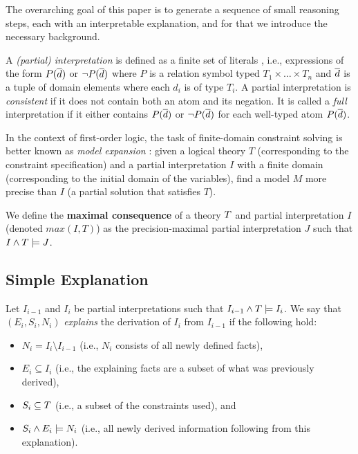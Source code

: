 The overarching goal of this paper is to generate a sequence of small reasoning steps, each with an interpretable explanation, and for that we introduce the necessary background.

A \emph{(partial) interpretation} is defined as a finite set of literals 
, i.e., expressions of the form 
$P(\overline{d})$ or $\lnot P(\overline{d})$ where $P$ is a relation symbol typed $T_1\times\dots \times T_n$ and $\overline{d}$ is a tuple of domain elements where each $d_i$ is of type $T_i$. 
A partial interpretation is \emph{consistent} if it does not contain both an atom and its negation.
It is called a \emph{full} interpretation if it either contains $P(\overline{d})$ or $\lnot P(\overline{d})$ for each well-typed atom $P(\overline{d})$.

In the context of first-order logic, the task of finite-domain constraint solving is better known as \emph{model expansion} \cite{MitchellTHM06}: given a logical theory $T$ (corresponding to the constraint specification) and a partial interpretation $I$ with a finite domain (corresponding to the initial domain of the variables), find a model $M$ more precise than $I$ (a partial solution that satisfies $T$).

We define the \textbf{maximal consequence} of a theory $T$ and partial interpretation $I$ (denoted $max(I,T)$) as the precision-maximal partial interpretation $J$ such that  $I \wedge T \models J$.

\subsection{Simple Explanation}

Let $I_{i-1}$ and $I_i$ be partial interpretations such that $I_{i-1}\land T \models I_i$.
We say that $(E_i,S_i,N_i)$ \emph{explains} the derivation of $I_{i}$ from $I_{i-1}$ if the following hold:
\begin{itemize}
   \item $N_i= I_i \setminus I_{i-1}$ (i.e., $N_i$ consists of all newly defined facts), 
   \item $E_i\subseteq I_i$ (i.e., the explaining facts are a subset of what was previously derived),
   \item $S_i \subseteq T$ (i.e., a subset of the constraints used), and 
   \item $S_i \land E_i \models N_i$ (i.e., all newly derived information following from this explanation).
\end{itemize}

